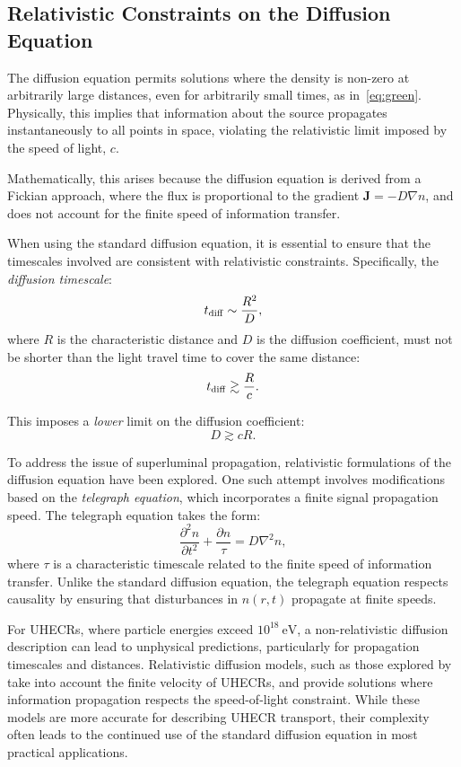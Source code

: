 \subsection{Relativistic Constraints on the Diffusion Equation }

The diffusion equation permits solutions where the density is non-zero at arbitrarily large distances, even for arbitrarily small times, as in~\ref{eq:green}. 
%
Physically, this implies that information about the source propagates instantaneously to all points in space, violating the relativistic limit imposed by the speed of light, \(c\).  

Mathematically, this arises because the diffusion equation is derived from a Fickian approach, where the flux is proportional to the gradient \( \mathbf{J} = -D \nabla n \), and does not account for the finite speed of information transfer.  

When using the standard diffusion equation, it is essential to ensure that the timescales involved are consistent with relativistic constraints. Specifically, the \emph{diffusion timescale}:  
\[
t_{\rm diff} \sim \frac{R^2}{D},
\]
where \(R\) is the characteristic distance and \(D\) is the diffusion coefficient, must not be shorter than the light travel time to cover the same distance:
\[
t_{\rm diff} \gtrsim \frac{R}{c}.
\]

This imposes a \emph{lower} limit on the diffusion coefficient:
\[
D \gtrsim c R.
\]

To address the issue of superluminal propagation, relativistic formulations of the diffusion equation have been explored. One such attempt involves modifications based on the \emph{telegraph equation}, which incorporates a finite signal propagation speed. The telegraph equation takes the form:
\[
\frac{\partial^2 n}{\partial t^2} + \frac{\partial n}{\tau} = D \nabla^2 n,
\]
where \(\tau\) is a characteristic timescale related to the finite speed of information transfer. Unlike the standard diffusion equation, the telegraph equation respects causality by ensuring that disturbances in \( n(r, t)\) propagate at finite speeds.  

For UHECRs, where particle energies exceed \(10^{18}~\text{eV}\), a non-relativistic diffusion description can lead to unphysical predictions, particularly for propagation timescales and distances. Relativistic diffusion models, such as those explored by~\cite{Berezinskii2012} take into account the finite velocity of UHECRs,  and provide solutions where information propagation respects the speed-of-light constraint.  
%
While these models are more accurate for describing UHECR transport, their complexity often leads to the continued use of the standard diffusion equation in most practical applications.  

